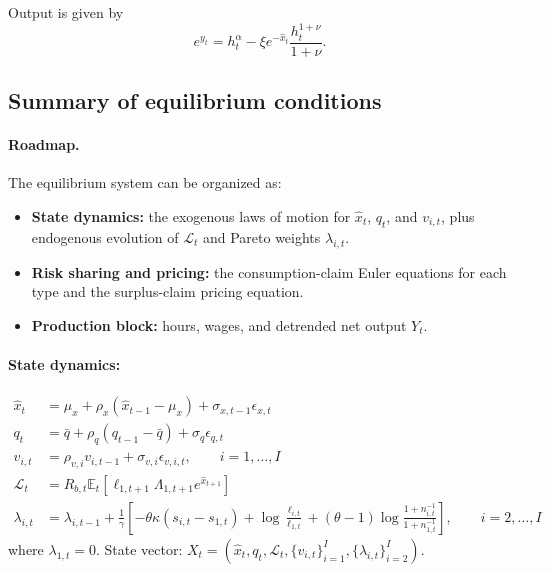 Output is given by
\begin{equation}
    e^{y_t} = h_t^\alpha - \xi e^{-\hat{x}_t} \frac{h_t^{1+\nu}}{1+\nu}.
\end{equation}

\subsection{Summary of equilibrium conditions}

\paragraph{Roadmap.} The equilibrium system can be organized as:
\begin{itemize}
    \item \textbf{State dynamics:} the exogenous laws of motion for \(\hat{x}_t\), \(q_t\), and \(v_{i,t}\), plus endogenous evolution of \(\mathcal{L}_t\) and Pareto weights \(\lambda_{i,t}\).
    \item \textbf{Risk sharing and pricing:} the consumption-claim Euler equations for each type and the surplus-claim pricing equation.
    \item \textbf{Production block:} hours, wages, and detrended net output \(Y_t\).
\end{itemize}

\paragraph{State dynamics:}\small
\begin{align}
    \hat{x}_t &= \mu_x + \rho_x (\hat{x}_{t-1}-\mu_x) + \sigma_{x,t-1}\epsilon_{x,t}\\
    q_t &= \bar{q} + \rho_q(q_{t-1}-\bar{q}) + \sigma_q \epsilon_{q,t}\\
    v_{i,t} &= \rho_{v,i} v_{i,t-1} + \sigma_{v,i} \epsilon_{v,i,t}, \qquad i = 1,\ldots, I\\
        \mathcal{L}_t &= R_{b,t} \mathbb{E}_t\left[ \ell_{1,t+1} \Lambda_{1,t+1} e^{\hat{x}_{t+1}} \right]\\
            \lambda_{i,t} &= \lambda_{i,t-1} + \frac{1}{\gamma}\left[- \theta \kappa (s_{i,t}-s_{1,t}) + \log \frac{\ell_{i,t}}{\ell_{1,t}} + (\theta-1) \log \frac{1+n_{i,t}^{-1}}{1+n_{1,t}^{-1}} \right], \qquad i = 2,\ldots, I
\end{align}\normalsize
where $\lambda_{1,t} = 0$. State vector: $X_t = (\hat{x}_t, q_t, \mathcal{L}_t,\{v_{i,t}\}_{i=1}^I, \{\lambda_{i,t}\}_{i=2}^I) $.  

